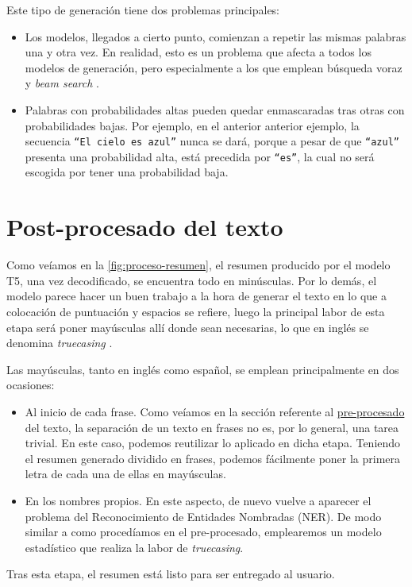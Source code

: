 Este tipo de generación tiene dos problemas principales:

\begin{itemize}
	\item [\textbullet] Los modelos, llegados a cierto punto, comienzan a repetir las mismas palabras una y otra vez. En realidad, esto es un problema que afecta a todos los modelos de generación, pero especialmente a los que emplean búsqueda voraz y \emph{beam search} \cite{vijayakumar16, shao17}.
	\item [\textbullet] Palabras con probabilidades altas pueden quedar enmascaradas tras otras con probabilidades bajas. Por ejemplo, en el anterior anterior ejemplo, la secuencia \texttt{``El cielo es azul''} nunca se dará, porque a pesar de que \texttt{``azul''} presenta una probabilidad alta, está precedida por \texttt{``es''}, la cual no será escogida por tener una probabilidad baja.
\end{itemize}

\section{Post-procesado del texto} \label{sec:postprocesado}

Como veíamos en la \autoref{fig:proceso-resumen}, el resumen producido por el modelo T5, una vez decodificado, se encuentra todo en minúsculas. Por lo demás, el modelo parece hacer un buen trabajo a la hora de generar el texto en lo que a colocación de puntuación y espacios se refiere, luego la principal labor de esta etapa será poner mayúsculas allí donde sean necesarias, lo que en inglés se denomina \emph{truecasing} \cite{lita03}.

Las mayúsculas, tanto en inglés como español, se emplean principalmente en dos ocasiones:

\vspace*{-\baselineskip}
\begin{itemize}
	\item Al inicio de cada frase. Como veíamos en la sección referente al \hyperref[sec:preprocesado]{pre-procesado} del texto, la separación de un texto en frases no es, por lo general, una tarea trivial. En este caso, podemos reutilizar lo aplicado en dicha etapa. Teniendo el resumen generado dividido en frases, podemos fácilmente poner la primera letra de cada una de ellas en mayúsculas.
	\item En los nombres propios. En este aspecto, de nuevo vuelve a aparecer el problema del Reconocimiento de Entidades Nombradas (NER). De modo similar a como procedíamos en el pre-procesado, emplearemos un modelo estadístico que realiza la labor de \emph{truecasing}.
\end{itemize}

Tras esta etapa, el resumen está listo para ser entregado al usuario.